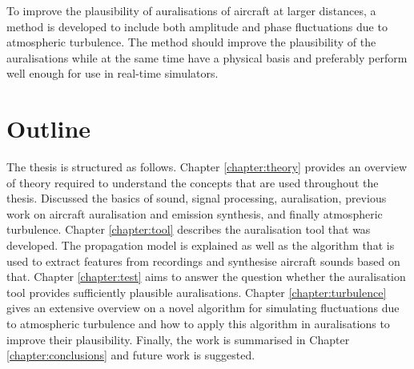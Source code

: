 To improve the plausibility of auralisations of aircraft at larger distances, a
method is developed to include both amplitude and phase fluctuations due to
atmospheric turbulence. The method should improve the plausibility of the
auralisations while at the same time have a physical basis and preferably
perform well enough for use in real-time simulators.


%
%
%

\section{Outline}
The thesis is structured as follows.
\newline
\newline
Chapter \ref{chapter:theory} provides an overview of theory required to understand the concepts that are used throughout the thesis.
Discussed the basics of sound, signal processing, auralisation, previous work on aircraft auralisation and emission synthesis, and finally atmospheric turbulence.
\newline
\newline
Chapter \ref{chapter:tool} describes the auralisation tool that was developed. The propagation model is explained as well as the algorithm that is used to extract features from recordings and synthesise aircraft sounds based on that.
\newline
\newline
Chapter \ref{chapter:test} aims to answer the question whether the auralisation
tool provides sufficiently plausible auralisations.
\newline
\newline
Chapter \ref{chapter:turbulence} gives an extensive overview on a novel
algorithm for simulating fluctuations due to atmospheric turbulence and how to
apply this algorithm in auralisations to improve their plausibility.
\newline
\newline
Finally, the work is summarised in Chapter \ref{chapter:conclusions} and future work is suggested.


